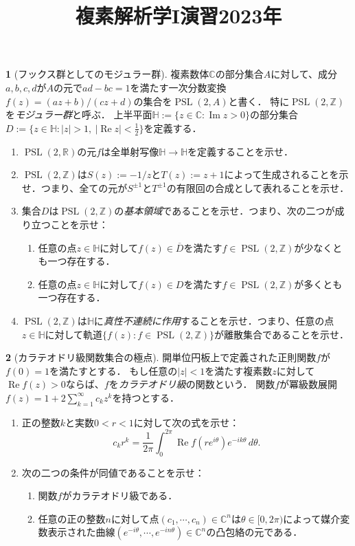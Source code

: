 \documentclass[a4paper]{article}
\theoremstyle{definition}
\newtheorem{prb}{}
\renewcommand{\Re}{\operatorname{Re}}
\renewcommand{\Im}{\operatorname{Im}}
\renewcommand{\H}{\mathbb{H}}
\newcommand{\C}{\mathbb{C}}
\newcommand{\R}{\mathbb{R}}
\newcommand{\Z}{\mathbb{Z}}
\newcommand{\PSL}{\operatorname{PSL}}
\renewcommand{\bar}{\overline}
\begin{document}
\title{複素解析学I演習2023年}
\date{}
\maketitle


\begin{prb}[フックス群としてのモジュラー群]
複素数体$\C$の部分集合$A$に対して、成分$a,b,c,d$が$A$の元で$ad-bc=1$を満たす一次分数変換$f(z)=(az+b)/(cz+d)$の集合を$\PSL(2,A)$と書く．
特に$\PSL(2,\Z)$を\emph{モジュラー群}と呼ぶ．
上半平面$\H:=\{z\in\C:\Im z>0\}$の部分集合$D:=\{z\in\H:|z|>1,\ |\Re z|<\frac12\}$を定義する．
\begin{enumerate}[label=(\arabic*)]
\item $\PSL(2,\R)$の元$f$は全単射写像$\H\to\H$を定義することを示せ．
\item $\PSL(2,\Z)$は$S(z):=-1/z$と$T(z):=z+1$によって生成されることを示せ．つまり、全ての元が$S^{\pm1}$と$T^{\pm1}$の有限回の合成として表れることを示せ．
\item 集合$D$は$\PSL(2,\Z)$の\emph{基本領域}であることを示せ．つまり、次の二つが成り立つことを示せ：
\begin{enumerate}[label=(\alph*)]
\item 任意の点$z\in\H$に対して$f(z)\in\bar D$を満たす$f\in\PSL(2,\Z)$が少なくとも一つ存在する．
\item 任意の点$z\in\H$に対して$f(z)\in D$を満たす$f\in\PSL(2,\Z)$が多くとも一つ存在する．
\end{enumerate}
\item $\PSL(2,\Z)$は$\H$に\emph{真性不連続に作用}することを示せ．つまり、任意の点$z\in\H$に対して軌道$\{f(z):f\in\PSL(2,\Z)\}$が離散集合であることを示せ．
\end{enumerate}
\end{prb}


\begin{prb}[カラテオドリ級関数集合の極点]
開単位円板上で定義された正則関数$f$が$f(0)=1$を満たすとする．
もし任意の$|z|<1$を満たす複素数$z$に対して$\Re f(z)>0$ならば、$f$を\emph{カラテオドリ級}の関数という．
関数$f$が冪級数展開$f(z)=1+2\sum_{k=1}^\infty c_kz^k$を持つとする．
\begin{enumerate}[label=(\arabic*)]
\item 正の整数$k$と実数$0<r<1$に対して次の式を示せ：
\[c_kr^k=\frac1{2\pi}\int_0^{2\pi}\Re f(re^{i\theta})e^{-ik\theta}\,d\theta.\]
\item 次の二つの条件が同値であることを示せ：
\begin{enumerate}[label=(\alph*)]
\item 関数$f$がカラテオドリ級である．
\item 任意の正の整数$n$に対して点$(c_1,\cdots,c_n)\in\C^n$は$\theta\in[0,2\pi)$によって媒介変数表示された曲線$(e^{-i\theta},\cdots,e^{-in\theta})\in\C^n$の凸包絡の元である．
\end{enumerate}
\end{enumerate}
\end{prb}
\end{document}
